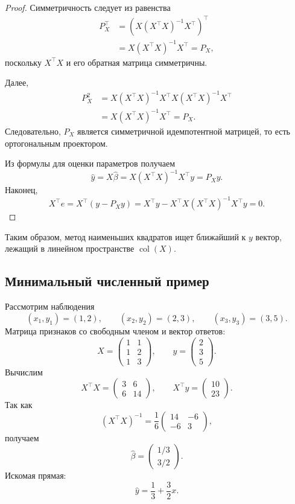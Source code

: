 \documentclass[12pt,a4paper]{article}
\theoremstyle{definition}
\theoremstyle{remark}
\newcommand{\col}{\operatorname{col}}
\begin{document}
\begin{proof}
Симметричность следует из равенства
\[
\begin{split}
    P_X^\top
    &=
    \left(
        X(X^\top X)^{-1}X^\top
    \right)^\top\\
    &=
    X(X^\top X)^{-1}X^\top=P_X,
\end{split}
\]
поскольку $X^\top X$ и его обратная матрица симметричны.

Далее,
\[
\begin{split}
    P_X^2
    &=
    X(X^\top X)^{-1}X^\top
    X(X^\top X)^{-1}X^\top\\
    &=
    X(X^\top X)^{-1}X^\top=P_X.
\end{split}
\]
Следовательно, $P_X$ является симметричной идемпотентной матрицей, то есть
ортогональным проектором.

Из формулы для оценки параметров получаем
\[
    \widehat y
    =
    X\widehat\beta
    =
    X(X^\top X)^{-1}X^\top y
    =
    P_Xy.
\]
Наконец,
\[
    X^\top e
    =
    X^\top(y-P_Xy)
    =
    X^\top y-X^\top X(X^\top X)^{-1}X^\top y
    =
    0.
\]
\end{proof}

Таким образом, метод наименьших квадратов ищет ближайший к $y$ вектор,
лежащий в линейном пространстве $\col(X)$.

\subsection{Минимальный численный пример}

Рассмотрим наблюдения
\[
    (x_1,y_1)=(1,2),\qquad
    (x_2,y_2)=(2,3),\qquad
    (x_3,y_3)=(3,5).
\]
Матрица признаков со свободным членом и вектор ответов:
\[
    X=
    \begin{pmatrix}
        1&1\\
        1&2\\
        1&3
    \end{pmatrix},
    \qquad
    y=
    \begin{pmatrix}
        2\\3\\5
    \end{pmatrix}.
\]
Вычислим
\[
    X^\top X
    =
    \begin{pmatrix}
        3&6\\
        6&14
    \end{pmatrix},
    \qquad
    X^\top y
    =
    \begin{pmatrix}
        10\\23
    \end{pmatrix}.
\]
Так как
\[
    (X^\top X)^{-1}
    =
    \frac{1}{6}
    \begin{pmatrix}
        14&-6\\
        -6&3
    \end{pmatrix},
\]
получаем
\[
    \widehat\beta
    =
    \begin{pmatrix}
        1/3\\3/2
    \end{pmatrix}.
\]
Искомая прямая:
\[
    \boxed{
    \widehat y=\frac{1}{3}+\frac{3}{2}x
    }.
\]
\end{document}
